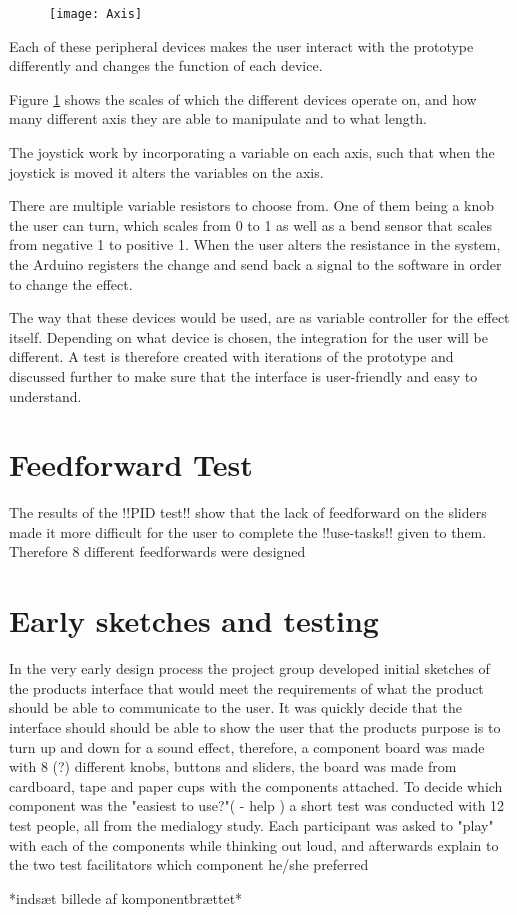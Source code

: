 \begin{figure}[!h] 
\centering
\texttt{[image: Axis]}
\caption{\label{fig:axis}}
\end{figure}



Each of these peripheral devices makes the user interact with the prototype differently and changes the function of each device.

Figure \ref{fig:axis} shows the scales of which the different devices operate on, and how many different axis they are able to manipulate and to what length.
 
The joystick work by incorporating a variable on each axis, such that when the joystick is moved it alters the variables on the axis. 

There are multiple variable resistors to choose from. One of them being a knob the user can turn, which scales from 0 to 1 as well as a bend sensor that scales from negative 1 to positive 1. When the user alters the resistance in the system, the Arduino registers the change and send back a signal to the software in order to change the effect.

The way that these devices would be used, are as variable controller for the effect itself. Depending on what device is chosen, the integration for the user will be different.  A test is therefore created with iterations of the prototype and discussed further to make sure that the interface is user-friendly and easy to understand. 

\section{Feedforward Test}\label{fftest}
The results of the !!PID test!! show that the lack of feedforward on the sliders made it more difficult for the user to complete the !!use-tasks!! given to them. Therefore 8 different feedforwards were designed 


\section{Early sketches and testing}
In the very early design process the project group developed initial sketches of the products interface that would meet the requirements of what the product should be able to communicate to the user. It was quickly decide that the interface should should be able to show the user that the products purpose is to turn up and down for a sound effect, therefore, a component board was made with 8 (?) different knobs, buttons and sliders, the board was made from cardboard, tape and paper cups with the components attached. To decide which component was the "easiest to use?"( - help ) a short test was conducted with 12 test people, all from the medialogy study. Each participant was asked to "play" with each of the components while thinking out loud, and afterwards explain to the two test facilitators which component he/she preferred 

*indsæt billede af komponentbrættet*

